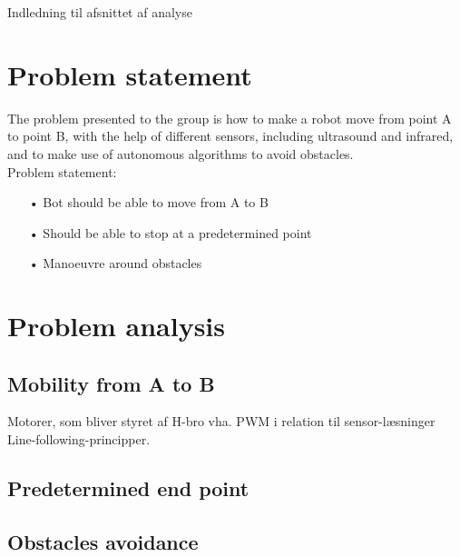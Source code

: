 Indledning til afsnittet af analyse\\

\section{Problem statement}

The problem presented to the group is how to make a robot move from point A to point B, with the help of different sensors, including ultrasound and infrared, and to make use of autonomous algorithms to avoid obstacles. \\

Problem statement:
\begin{enumerate}
\item[•]Bot should be able to move from A to B
\item[•]Should be able to stop at a predetermined point
\item[•]Manoeuvre around obstacles
\end{enumerate}

\section{Problem analysis}
\subsection{Mobility from A to B}
Motorer, som bliver styret af H-bro vha. PWM i relation til sensor-læsninger\\
Line-following-principper.\\

\subsection{Predetermined end point}
\subsection{Obstacles avoidance}